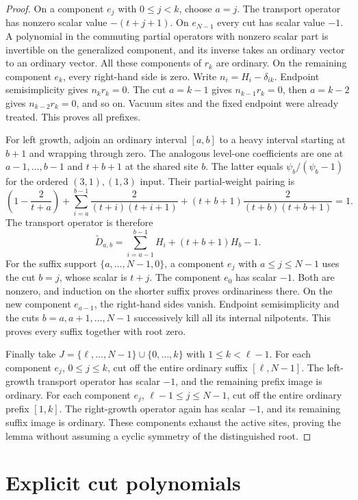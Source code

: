 \documentclass[11pt,a4paper]{article}
\numberwithin{equation}{section}
\theoremstyle{definition}\newtheorem{definition}[theorem]{Definition}
\theoremstyle{remark}\newtheorem{remark}[theorem]{Remark}
\begin{document}
\begin{proof}
On a component $e_j$ with $0\leq j<k$, choose $a=j$.  The transport
operator has nonzero scalar value $-(t+j+1)$.  On $e_{N-1}$ every
cut has scalar value $-1$.  A polynomial in the commuting partial
operators with nonzero scalar part is invertible on the generalized
component, and its inverse takes an ordinary vector to an ordinary
vector.  All these components of $r_k$ are ordinary.
On the remaining component $e_k$, every right-hand side is zero.
Write $n_i=H_i-\delta_{ik}$.  Endpoint semisimplicity gives $n_kr_k=0$.
The cut $a=k-1$ gives $n_{k-1}r_k=0$, then $a=k-2$ gives
$n_{k-2}r_k=0$, and so on.  Vacuum sites and the fixed endpoint
were already treated.  This proves all prefixes.

For left growth, adjoin an ordinary interval $[a,b]$ to a heavy
interval starting at $b+1$ and wrapping through zero.  The analogous
level-one coefficients are one at $a-1,\ldots,b-1$ and $t+b+1$
at the shared site $b$.  The latter equals
$\psi_b/(\psi_b-1)$ for the ordered $(3,1),(1,3)$ input.
Their partial-weight pairing is
\[
 \left(1-\frac2{t+a}\right)
 +\sum_{i=a}^{b-1}\frac2{(t+i)(t+i+1)}
 +(t+b+1)\frac2{(t+b)(t+b+1)}=1.
\]
The transport operator is therefore
\[
                \widetilde D_{a,b}
                =\sum_{i=a-1}^{b-1}H_i+(t+b+1)H_b-1.
\]
For the suffix support $\{a,\ldots,N-1,0\}$, a component $e_j$
with $a\leq j\leq N-1$ uses the cut $b=j$, whose scalar is $t+j$.
The component $e_0$ has scalar $-1$.  Both are nonzero, and induction
on the shorter suffix proves ordinariness there.  On the new component
$e_{a-1}$, the right-hand sides vanish.  Endpoint semisimplicity
and the cuts $b=a,a+1,\ldots,N-1$ successively kill all its internal
nilpotents.  This proves every suffix together with root zero.

Finally take
$J=\{\ell,\ldots,N-1\}\cup\{0,\ldots,k\}$ with
$1\leq k<\ell-1$.  For each component $e_j$, $0\leq j\leq k$,
cut off the entire ordinary suffix $[\ell,N-1]$.  The left-growth
transport operator has scalar $-1$, and the remaining prefix image
is ordinary.  For each component $e_j$, $\ell-1\leq j\leq N-1$,
cut off the entire ordinary prefix $[1,k]$.  The right-growth
operator again has scalar $-1$, and its remaining suffix image is
ordinary.  These components exhaust the active sites, proving the
lemma without assuming a cyclic symmetry of the distinguished root.
\end{proof}



\section{Explicit cut polynomials}
\label{neutral:app:cut-polynomials}
\end{document}
